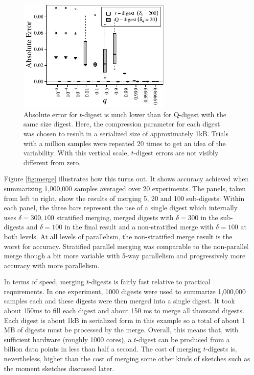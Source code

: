\documentclass{vldb}
\begin{document}
\begin{figure}[h] %
   \centering
   \includegraphics[width=3in]{figures/qd-sizes-small.pdf} 
   \caption{Absolute error for $t$-digest is much lower than for Q-digest with the same size digest. Here, the compression parameter for each digest was chosen to result in a serialized size of approximately 1kB. Trials with a million samples were repeated 20 times to get an idea of the variability. With this vertical scale, $t$-digest errors are not visibly different from zero.  }
   \label{fig:qd-comparison}
\end{figure}
Figure \ref{fig:merge} illustrates how this turns out. It shows accuracy achieved when summarizing 1,000,000 samples averaged over 20 experiments. The panels, taken from left to right, show the results of merging 5, 20 and 100 sub-digests. Within each panel, the three bars represent the use of a single digest which internally uses $\delta=300,100$ stratified merging, merged digests with $\delta=300$ in the sub-digests and $\delta=100$ in the final result and a non-stratified merge with $\delta=100$ at both levels. At all levels of parallelism, the non-stratified merge result is the worst for accuracy. Stratified parallel merging was comparable to the non-parallel merge though a bit more variable with 5-way parallelism and progressively more accuracy with more parallelism.


In terms of speed, merging $t$-digests is fairly fast relative to practical requirements. In one experiment, 1000 digests were used to summarize 1,000,000 samples each and these digests were then merged into a single digest. It took about 150ms to fill each digest and about 150 ms to merge all thousand digests. Each digest is about 1kB in serialized form in this example so a total of about 1 MB of digests must be processed by the merge. Overall, this means that, with sufficient hardware (roughly 1000 cores), a $t$-digest can be produced from a billion data points in less than half a second. The cost of merging $t$-digests is, nevertheless, higher than the cost of merging some other kinds of sketches such as the moment sketches discussed later.
\end{document}
